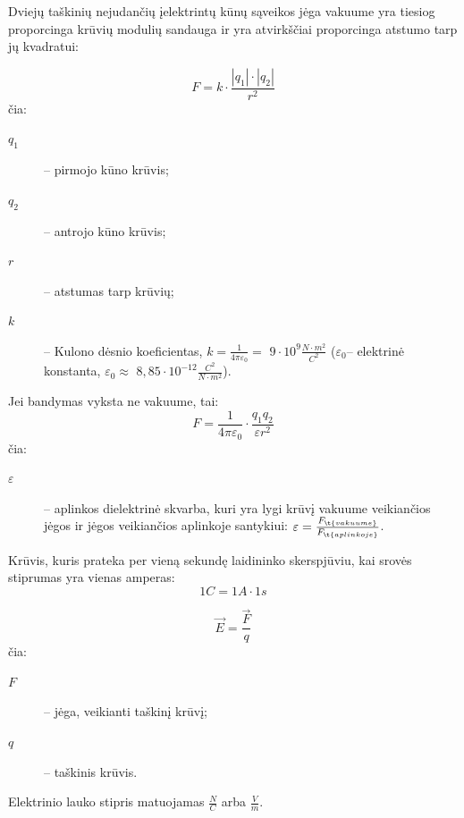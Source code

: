 \begin{defn}
  Dviejų taškinių nejudančių įelektrintų kūnų sąveikos jėga vakuume
  yra tiesiog proporcinga krūvių modulių sandauga ir yra atvirkščiai
  proporcinga atstumo tarp jų kvadratui:

  \begin{equation}
    F = k \cdot \frac{|q_{1}| \cdot |q_{2}|}{r^{2}}
    \label{eq:kulono_desnis}
  \end{equation}
  čia:
  \begin{description}
    \item[$q_{1}$] – pirmojo kūno krūvis;
    \item[$q_{2}$] – antrojo kūno krūvis;
    \item[$r$] – atstumas tarp krūvių;
    \item[$k$] – Kulono dėsnio koeficientas,
      $k = \frac{1}{4 \pi \varepsilon_{0}} =$
      $9 \cdot 10^{9} \frac{N \cdot m^{2}}{C^{2}}$
      ($\varepsilon_{0}$– elektrinė konstanta, $\varepsilon_{0} \approx $
      $8,85 \cdot 10^{-12} \frac{C^{2}}{N \cdot m^{2}}$).
  \end{description}

  Jei bandymas vyksta ne vakuume, tai:
  \begin{equation*}
    F =
      \frac{1}{4 \pi \varepsilon_{0}} \cdot
      \frac{q_{1}q_{2}}{\varepsilon r^{2}}
  \end{equation*}
  čia:
  \begin{description}
    \item[$\varepsilon$] – aplinkos dielektrinė skvarba, kuri yra lygi
      krūvį vakuume veikiančios jėgos ir jėgos veikiančios
      aplinkoje santykiui:
      $\varepsilon = \frac{F_{\t{vakuume}}}{F_{\t{aplinkoje}}}$.
  \end{description}
\end{defn}

\begin{defn}[Kulonas]
  Krūvis, kuris prateka per vieną sekundę laidininko skerspjūviu, kai
  srovės stiprumas yra vienas amperas:
  \begin{equation*}
    1 C = 1A \cdot 1s
  \end{equation*}
\end{defn}

\begin{defn}
  \begin{equation*}
    \vec{E} = \frac{\vec{F}}{q}
  \end{equation*}
  čia:
  \begin{description}
    \item[$F$] – jėga, veikianti taškinį krūvį;
    \item[$q$] – taškinis krūvis.
  \end{description}
  Elektrinio lauko stipris matuojamas $\frac{N}{C}$ arba $\frac{V}{m}$.
\end{defn}

